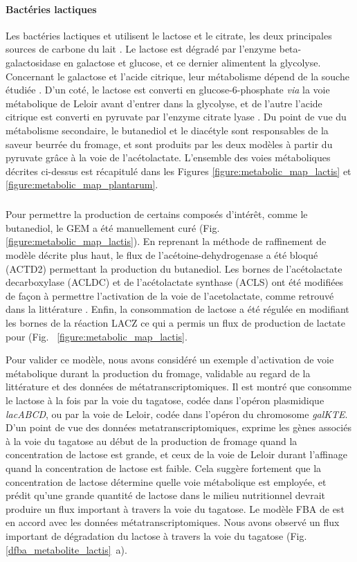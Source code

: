 \paragraph*{Bactéries lactiques}
Les bactéries lactiques \lactis et \plantarum utilisent le lactose et le citrate, les deux principales sources de carbone du lait \citep{Widyastuti2014}. Le lactose est dégradé par l'enzyme beta-galactosidase en galactose et glucose, et ce dernier alimentent la glycolyse. Concernant le galactose et l'acide citrique, leur métabolisme dépend de la souche étudiée \citep{Palles1998}. D'un coté, le lactose est converti en glucose-6-phosphate \textit{via} la voie métabolique de Leloir avant d'entrer dans la glycolyse, et de l'autre l'acide citrique est converti en pyruvate par l'enzyme citrate lyase \citep{alma991000892589705596}. Du point de vue du métabolisme secondaire, le butanediol et le diacétyle sont responsables de la saveur beurrée du fromage, et sont produits par les deux modèles à partir du pyruvate grâce à la voie de l'acétolactate. L'ensemble des voies métaboliques décrites ci-dessus est récapitulé dans les Figures \ref{figure:metabolic_map_lactis} et \ref{figure:metabolic_map_plantarum}. \\



\subparagraph*{\lactis}
Pour permettre la production de certains composés d'intérêt, comme le butanediol, le GEM a été manuellement curé (Fig.~ \ref{figure:metabolic_map_lactis}). En reprenant la méthode de raffinement de modèle décrite plus haut, le flux de l'acétoine-dehydrogenase a été bloqué (ACTD2) permettant la production du butanediol. Les bornes de l'acétolactate decarboxylase (ACLDC) et de l'acétolactate synthase (ACLS) ont été modifiées de façon à permettre l'activation de la voie de l'acetolactate, comme retrouvé dans la littérature \citep*{Carroll1999,Swindell1996,Makhlouf2006}. Enfin, la consommation de lactose a été régulée en modifiant les bornes de la réaction LACZ ce qui a permis un flux de production de lactate pour \lactis (Fig.~ \ref{figure:metabolic_map_lactis}.

Pour valider ce modèle, nous avons considéré un exemple d'activation de voie métabolique durant la production du fromage, validable au regard de la littérature et des données de métatranscriptomiques. Il est montré que \lactis consomme le lactose à la fois par la voie du tagatose, codée dans l'opéron plasmidique \textit{lacABCD}, ou par la voie de Leloir, codée dans l'opéron du chromosome \textit{galKTE}. D'un point de vue des données metatranscriptomiques, \lactis exprime les gènes associés à la voie du tagatose au début de la production de fromage quand la concentration de lactose est grande, et ceux de la voie de Leloir durant l'affinage quand la concentration de lactose est faible. Cela suggère fortement que la concentration de lactose détermine quelle voie métabolique est employée, et prédit qu'une grande quantité de lactose dans le milieu nutritionnel devrait produire un flux important à travers la voie du tagatose. Le modèle FBA de \lactis est en accord avec les données métatranscriptomiques. Nous avons observé un flux important de dégradation du lactose à travers la voie du tagatose (Fig. \ref{dfba_metabolite_lactis}~a).

